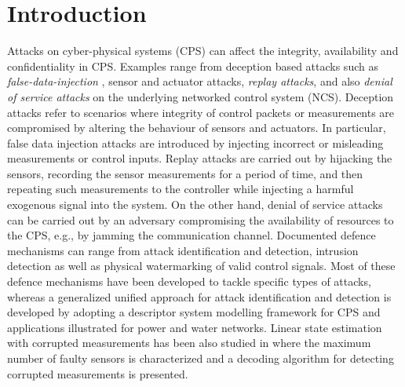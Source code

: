 \documentclass[journal,10pt]{IEEEtran}
\begin{document}
\section{Introduction}
Attacks on cyber-physical systems (CPS) can affect the integrity, availability and confidentiality in CPS.  Examples range from deception based attacks such as  {\em false-data-injection} \cite{kallesec15}, sensor and actuator attacks, {\em replay attacks}, and also {\em denial of service attacks} \cite{mo_sinopoli_15} on the underlying networked control system (NCS).
Deception attacks refer to scenarios where integrity of control packets or measurements are compromised by altering the behaviour of sensors and actuators. In particular, false data injection attacks are introduced by injecting incorrect or misleading measurements or control inputs. Replay attacks are carried out by hijacking the sensors, recording the sensor measurements for a period of time, and then repeating such measurements to the controller while injecting a harmful exogenous signal into the system. On the other hand, denial of service attacks can be carried out by an adversary compromising the availability of resources to the CPS, e.g., by jamming the communication channel. 
Documented defence mechanisms can range from attack identification and detection, intrusion detection as well as physical watermarking of valid control signals. Most of these defence mechanisms have been developed to tackle specific types of attacks, whereas a generalized unified approach for attack identification and detection 
is developed by adopting a descriptor system modelling framework for CPS \cite{bullo_sec_15} and applications illustrated for power and water networks. Linear state estimation with corrupted measurements has been also studied in 
\cite{tabuada_sec_14} where the maximum number of faulty sensors is characterized and a decoding algorithm for detecting corrupted measurements is presented. 
\end{document}
